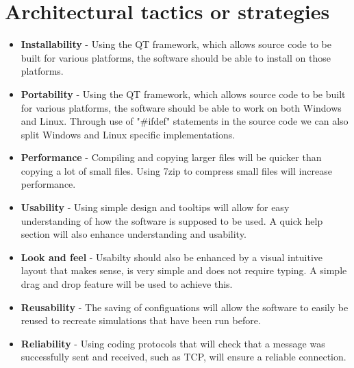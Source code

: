 \documentclass[a4paper,12pt,final]{article}
\begin{document}
\section{Architectural tactics or strategies}
\begin{itemize}
\item \textbf{Installability} - Using the QT framework, which allows source code to be built for various platforms, the software should be able to install on those platforms.
\item \textbf{Portability} - Using the QT framework, which allows source code to be built for various platforms, the software should be able to work on both Windows and Linux. Through use of "\#ifdef" statements in the source code we can also split Windows and Linux specific implementations.
\item \textbf{Performance} - Compiling and copying larger files will be quicker than copying a lot of small files. Using 7zip to compress small files will increase performance.
\item \textbf{Usability} - Using simple design and tooltips will allow for easy understanding of how the software is supposed to be used. A quick help section will also enhance understanding and usability.
\item \textbf{Look and feel} - Usabilty should also be enhanced by a visual intuitive layout that makes sense, is very simple and does not require typing. A simple drag and drop feature will be used to achieve this.
\item \textbf{Reusability} - The saving of configuations will allow the software to easily be reused to recreate simulations that have been run before.
\item \textbf{Reliability} - Using coding protocols that will check that a message was successfully sent and received, such as TCP, will ensure a reliable connection.
\end{itemize}

\newpage
\end{document}

